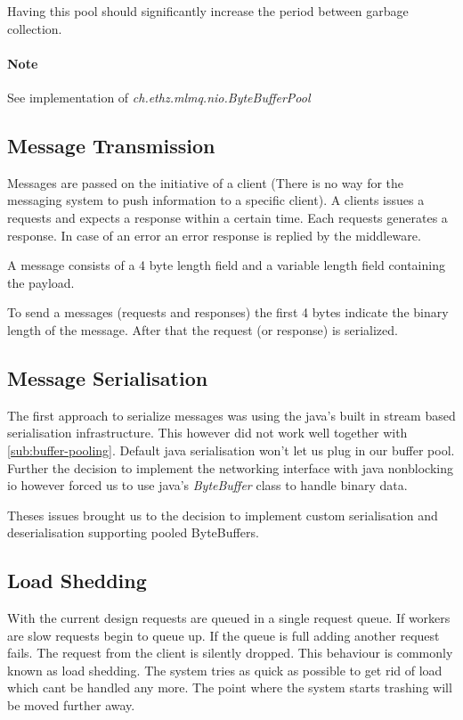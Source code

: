 \documentclass[milestone1.tex]{subfiles}
\begin{document}
Having this pool should significantly increase the period between garbage collection.

\paragraph{Note}
See implementation of \textit{ch.ethz.mlmq.nio.ByteBufferPool}

\subsection{Message Transmission}
Messages are passed on the initiative of a client (There is no way for the messaging system to push information to a specific client). A clients issues a requests and expects a response within a certain time. Each requests generates a response. In case of an error an error response is replied by the middleware.

A message consists of a 4 byte length field and a variable length field containing the payload.

To send a messages (requests and responses) the first 4 bytes indicate the binary length of the message. After that the request (or response) is serialized.

\subsection{Message Serialisation}
\label{sub:des-msg-ser}
The first approach to serialize messages was using the java's built in stream based serialisation infrastructure. This however did not work well together with \ref{sub:buffer-pooling}. Default java serialisation won't let us plug in our buffer pool. Further the decision to implement the networking interface with java nonblocking io however forced us to use java's \textit{ByteBuffer} class to handle binary data.

Theses issues brought us to the decision to implement custom serialisation and deserialisation supporting pooled ByteBuffers.

\subsection{Load Shedding}
With the current design requests are queued in a single request queue. If workers are slow requests begin to queue up. If the queue is full adding another request fails. The request from the client is silently dropped. This behaviour is commonly known as load shedding. The system tries as quick as possible to get rid of load which cant be handled any more. The point where the system starts trashing will be moved further away.
\end{document}
